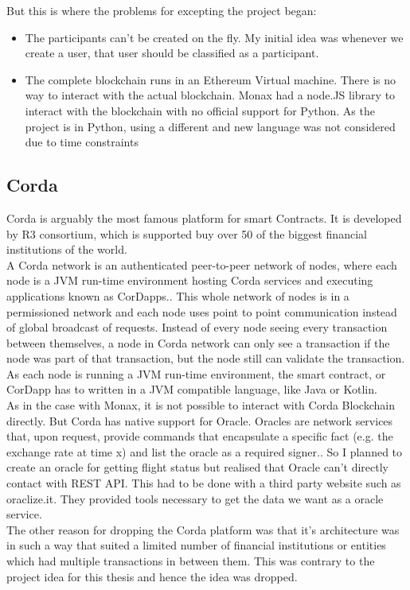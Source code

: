But this is where the problems for excepting the project began:
\begin{itemize}
    \item The participants can't be created on the fly. My initial idea was whenever we create a user, that user should be classified as a participant.
    \item The complete blockchain runs in an Ethereum Virtual machine. There is no way to interact with the actual blockchain. Monax had a node.JS library to interact with the blockchain with no official support for Python. As the project is in Python, using a different and new language was not considered due to time constraints
\end{itemize}

\subsection{Corda}
Corda is arguably the most famous platform for smart Contracts. It is developed by R3 consortium, which is supported buy over 50 of the biggest financial institutions of the world.
\\A Corda network is an authenticated peer-to-peer network of nodes, where each node is a JVM run-time environment hosting Corda services and executing applications known as CorDapps.\cite{Hearn2016Corda:Ledger}. This whole network of nodes is in a permissioned network and each node uses point to point communication instead of global broadcast of requests. Instead of every node seeing every transaction between themselves, a node in Corda network can only see a transaction if the node was part of that transaction, but the node still can validate the transaction.
As each node is running a JVM run-time environment, the smart contract, or CorDapp has to written in a JVM compatible language, like Java or Kotlin.
\\ As in the case with Monax, it is not possible to interact with Corda Blockchain directly. But Corda has native support for Oracle. Oracles are network services that, upon request, provide commands that encapsulate a specific fact (e.g. the exchange rate at time x) and list the oracle as a required signer.\cite{OraclesDocumentation}. So I planned to create an oracle for getting flight status but realised that Oracle can't directly contact with REST API. This had to be done with a third party website such as oraclize.it. They provided tools necessary to get the data we want as a oracle service. 
\\The other reason for dropping the Corda platform was that it's architecture was in such a way that suited a limited number of financial institutions or entities which had multiple transactions in between them. This was contrary to the project idea for this thesis and hence the idea was dropped.

